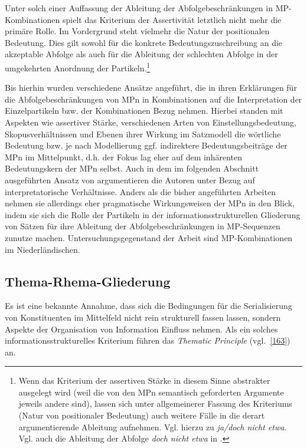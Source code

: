 Unter solch einer Auffassung der Ableitung der Abfolgebeschränkungen in MP-Kom\-bi\-na\-ti\-on\-en spielt das Kriterium der Assertivität  letztlich nicht mehr die primäre Rolle. Im Vordergrund steht vielmehr die Natur  der positionalen Bedeutung. Dies gilt sowohl für die konkrete Bedeutungszuschreibung an die akzep\-table Abfolge als auch für die Ableitung der schlechten Abfolge in der umgekehrten Anordnung der Partikeln.\footnote{Wenn das Kriterium der assertiven Stärke in diesem Sinne abstrakter ausgelegt wird (weil die von den MPn semantisch geforderten Argumente jeweils andere sind), lassen sich unter allgemeinerer Fassung des Kriteriums (Natur von positionaler Bedeutung) auch weitere Fälle in die derart argumentierende Ableitung aufnehmen. Vgl. hierzu \citet[83--84]{Doherty1985} zu \textit{ja/doch nicht etwa}. Vgl. auch die Ableitung der Abfolge \textit{doch nicht etwa} in \citet[447]{Rinas2007}.}\largerpage	
			
Bis hierhin wurden verschiedene Ansätze angeführt, die in ihren Erklärungen für die Abfolgebeschränkungen von MPn in Kombinationen auf die Interpretation der Einzelpartikeln bzw. der Kombinationen Bezug nehmen. Hierbei standen mit Aspekten wie assertiver Stärke, verschiedenen Arten von Einstellungsbedeutung, Skopusverhältnissen und Ebenen ihrer Wirkung im Satzmodell die wörtliche Bedeutung bzw. je nach Modellierung ggf. indirektere Bedeutungsbeiträge der MPn im Mittelpunkt, d.h. der Fokus lag eher auf dem inhärenten Bedeutungskern der MPn selbst. Auch in dem im folgenden Abschnitt ausgeführten Ansatz von \citet{Vriendt1991} argumentieren die Autoren unter Bezug auf interpretatorische Verhältnisse. Anders als die bisher angeführten Arbeiten nehmen sie allerdings eher pragmatische Wirkungsweisen der MPn in den Blick, indem sie sich die Rolle der Partikeln in der informationsstrukturellen Gliederung von Sätzen für ihre Ableitung der Abfolgebeschränkungen in MP-Sequenzen zunutze machen. Untersuchungsgegenstand der Arbeit sind MP-Kom\-bi\-na\-ti\-on\-en im Niederländischen.

\subsection{Thema-Rhema-Gliederung}
Es ist eine bekannte Annahme, dass sich die Bedingungen für die Serialisierung von Konstituenten im Mittelfeld nicht rein strukturell fassen lassen, sondern Aspekte der Organisation von Information Einfluss nehmen. Als ein solches informationsstrukturelles Kriterium führen \citet[44]{Vriendt1991} das \textit{Thematic Principle} (vgl.\ \ref{163}) an.

